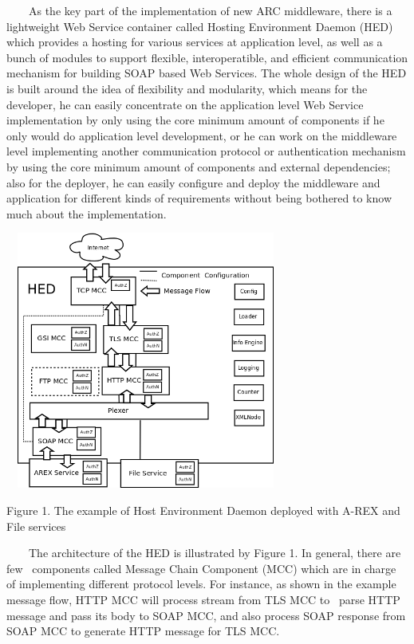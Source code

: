 \documentclass{article}
\begin{document}
\ \ \ \ As the key part of the implementation of new ARC middleware,
there is a lightweight Web Service container called Hosting Environment
Daemon (HED) which provides a hosting for various services at
application level, as well as a bunch of modules to support flexible,
interoperatible, and efficient communication mechanism for building
SOAP based Web Services. The whole design of the HED is built around
the idea of flexibility and modularity, which means for the developer,
he can easily concentrate on the application level Web Service
implementation by only using the core minimum amount of components if
he only would do application level development, or he can work on the
middleware level implementing another communication protocol or
authentication mechanism by using the core minimum amount of components
and external dependencies; also for the deployer, he can easily
configure and deploy the middleware and application for different kinds
of requirements without being bothered to know much about the
implementation.



\begin{center}
\includegraphics[width=3.6362in,height=3.3339in]{Secpaper-img1.png}
\end{center}
{\centering
Figure 1. The example of Host Environment Daemon deployed with A-REX and
File services
\par}

\ \ \ \ The architecture of the HED is illustrated by Figure 1. In
general, there are few \ components called Message Chain Component
(MCC) which are in charge of implementing different protocol levels.
For instance, as shown in the example message flow, HTTP MCC will
process stream from TLS MCC to \ parse HTTP message and pass its body
to SOAP MCC, and also process SOAP response from SOAP MCC to generate
HTTP message for TLS MCC. 
\end{document}
